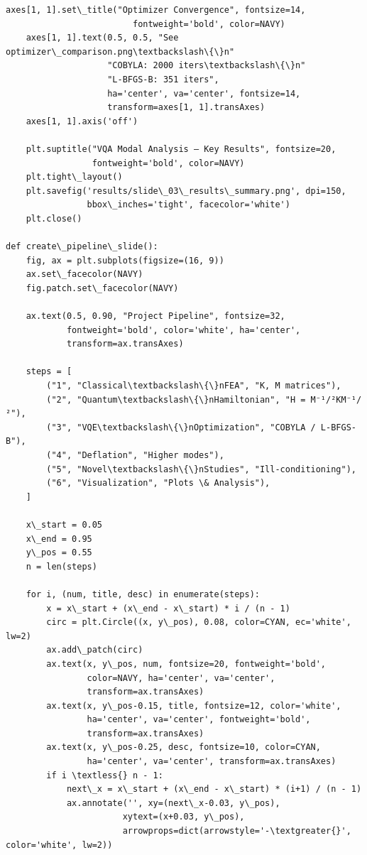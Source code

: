 \documentclass[12pt, a4paper]{article}
\begin{document}
\begin{lstlisting}[style=codestyle, caption={{generate_presentation.py --- Slide Generator}}]
    axes[1, 1].set\_title("Optimizer Convergence", fontsize=14,
                         fontweight='bold', color=NAVY)
    axes[1, 1].text(0.5, 0.5, "See optimizer\_comparison.png\textbackslash\{\}n"
                    "COBYLA: 2000 iters\textbackslash\{\}n"
                    "L-BFGS-B: 351 iters",
                    ha='center', va='center', fontsize=14,
                    transform=axes[1, 1].transAxes)
    axes[1, 1].axis('off')

    plt.suptitle("VQA Modal Analysis — Key Results", fontsize=20,
                 fontweight='bold', color=NAVY)
    plt.tight\_layout()
    plt.savefig('results/slide\_03\_results\_summary.png', dpi=150,
                bbox\_inches='tight', facecolor='white')
    plt.close()

def create\_pipeline\_slide():
    fig, ax = plt.subplots(figsize=(16, 9))
    ax.set\_facecolor(NAVY)
    fig.patch.set\_facecolor(NAVY)

    ax.text(0.5, 0.90, "Project Pipeline", fontsize=32,
            fontweight='bold', color='white', ha='center',
            transform=ax.transAxes)

    steps = [
        ("1", "Classical\textbackslash\{\}nFEA", "K, M matrices"),
        ("2", "Quantum\textbackslash\{\}nHamiltonian", "H = M⁻¹/²KM⁻¹/²"),
        ("3", "VQE\textbackslash\{\}nOptimization", "COBYLA / L-BFGS-B"),
        ("4", "Deflation", "Higher modes"),
        ("5", "Novel\textbackslash\{\}nStudies", "Ill-conditioning"),
        ("6", "Visualization", "Plots \& Analysis"),
    ]

    x\_start = 0.05
    x\_end = 0.95
    y\_pos = 0.55
    n = len(steps)

    for i, (num, title, desc) in enumerate(steps):
        x = x\_start + (x\_end - x\_start) * i / (n - 1)
        circ = plt.Circle((x, y\_pos), 0.08, color=CYAN, ec='white', lw=2)
        ax.add\_patch(circ)
        ax.text(x, y\_pos, num, fontsize=20, fontweight='bold',
                color=NAVY, ha='center', va='center',
                transform=ax.transAxes)
        ax.text(x, y\_pos-0.15, title, fontsize=12, color='white',
                ha='center', va='center', fontweight='bold',
                transform=ax.transAxes)
        ax.text(x, y\_pos-0.25, desc, fontsize=10, color=CYAN,
                ha='center', va='center', transform=ax.transAxes)
        if i \textless{} n - 1:
            next\_x = x\_start + (x\_end - x\_start) * (i+1) / (n - 1)
            ax.annotate('', xy=(next\_x-0.03, y\_pos),
                       xytext=(x+0.03, y\_pos),
                       arrowprops=dict(arrowstyle='-\textgreater{}', color='white', lw=2))


\end{lstlisting}
\end{document}
